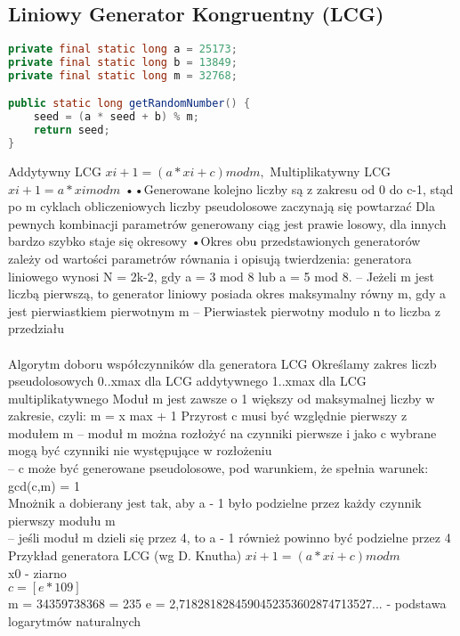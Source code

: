 \documentclass[a4paper, 11pt]{article} %
\begin{document}
\subsection{Liniowy Generator Kongruentny (LCG)}
\begin{lstlisting}[style=mystyle, language=java, frame=single]
private final static long a = 25173;
private final static long b = 13849;
private final static long m = 32768;

public static long getRandomNumber() {
    seed = (a * seed + b) % m;
    return seed;
}
\end{lstlisting}
Addytywny LCG
$xi+1=(a*xi+c) mod m,$
Multiplikatywny LCG
$xi+1 = a * x i mod m$
••Generowane kolejno liczby są z zakresu od 0 do
c-1, stąd po m cyklach obliczeniowych liczby
pseudolosowe zaczynają się powtarzać
Dla pewnych kombinacji parametrów
generowany ciąg jest prawie losowy, dla innych
bardzo szybko staje się okresowy
•Okres obu przedstawionych generatorów zależy
od wartości parametrów równania i opisują
twierdzenia:
generatora liniowego wynosi N = 2k-2, gdy a = 3 mod
8 lub a = 5 mod 8.
– Jeżeli m jest liczbą pierwszą, to generator liniowy
posiada okres maksymalny równy m, gdy a jest pierwiastkiem pierwotnym m
– Pierwiastek pierwotny modulo n to liczba z przedziału
\\ \\Algorytm doboru współczynników dla generatora LCG
Określamy zakres liczb pseudolosowych
0..xmax dla LCG addytywnego
1..xmax dla LCG multiplikatywnego
Moduł m jest zawsze o 1 większy od maksymalnej liczby
w zakresie, czyli:
m = x max + 1
Przyrost c musi być względnie pierwszy z modułem m
– moduł m można rozłożyć na czynniki pierwsze i jako c wybrane mogą być czynniki nie występujące w rozłożeniu\\
– c może być generowane pseudolosowe, pod warunkiem, że spełnia warunek: gcd(c,m) = 1\\
Mnożnik a dobierany jest tak, aby a - 1 było podzielne przez każdy czynnik pierwszy modułu m\\
– jeśli moduł m dzieli się przez 4, to a - 1 również powinno być podzielne przez 4\\
Przykład generatora LCG (wg D. Knutha)
$xi+1=(a*xi+c) mod m$\\
x0 - ziarno \\
$c=[e*109]$\\
m = 34359738368 = 235
e = 2,7182818284590452353602874713527...
- podstawa logarytmów naturalnych
\end{document}
